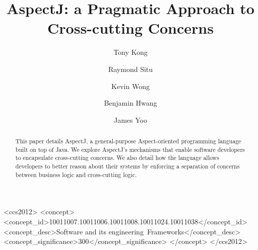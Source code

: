 \documentclass[sigconf]{acmart}
\begin{document}
\title{AspectJ: a Pragmatic Approach to Cross-cutting Concerns}

\author{Tony Kong}

\author{Raymond Situ}

\author{Kevin Wong}

\author{Benjamin Hwang}

\author{James Yoo}

\begin{abstract}
This paper details AspectJ, a general-purpose Aspect-oriented programming language built on top of Java. We explore AspectJ's mechanisms that enable software developers to encapsulate cross-cutting concerns. We also detail how the language allows developers to better reason about their systems by enforcing a separation of concerns between business logic and cross-cutting logic.
\end{abstract}

\begin{CCSXML}
<ccs2012>
<concept>
<concept_id>10011007.10011006.10011008.10011024.10011038</concept_id>
<concept_desc>Software and its engineering~Frameworks</concept_desc>
<concept_significance>300</concept_significance>
</concept>
</ccs2012>
\end{CCSXML}

\maketitle
\end{document}

